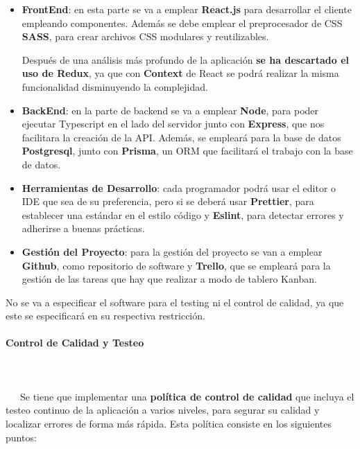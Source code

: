 \begin{itemize}
	\item \textbf{FrontEnd}: en esta parte se va a emplear \textbf{React.js} para desarrollar el cliente empleando componentes. Además se debe emplear el preprocesador de CSS \textbf{SASS}, para crear archivos CSS modulares y reutilizables. 
	
	Después de una análisis más profundo de la aplicación \textbf{se ha descartado el uso de Redux}, ya que con \textbf{Context} de React se podrá realizar la misma funcionalidad disminuyendo la complejidad.
	
	\item \textbf{BackEnd}: en la parte de backend se va a emplear \textbf{Node}, para poder ejecutar Typescript en el lado del servidor junto con \textbf{Express}, que nos facilitara la creación de la API. Además, se empleará para la base de datos \textbf{Postgresql}, junto con \textbf{Prisma}, un \gls{ORM} que facilitará el trabajo con la base de datos.
	
	\item \textbf{Herramientas de Desarrollo}: cada programador podrá usar el editor o IDE que sea de su preferencia, pero si se deberá usar \textbf{Prettier}, para establecer una estándar en el estilo código y \textbf{Eslint}, para detectar errores y adherirse a buenas prácticas.	
	
	\item \textbf{Gestión del Proyecto}: para la gestión del proyecto se van a emplear \textbf{Github}, como repositorio de software y \textbf{Trello}, que se empleará para la gestión de las tareas que hay que realizar a modo de tablero Kanban.
\end{itemize}

No se va a especificar el software para el testing ni el control de calidad, ya que este se especificará en su respectiva restricción.
 

\paragraph{Control de Calidad y Testeo}
~\\\\
\-\ \-\ \-\ Se tiene que implementar una \textbf{política de control de calidad} que incluya el testeo continuo de la aplicación a varios niveles, para segurar su calidad y localizar errores de forma más rápida. Esta política consiste en los siguientes puntos:

